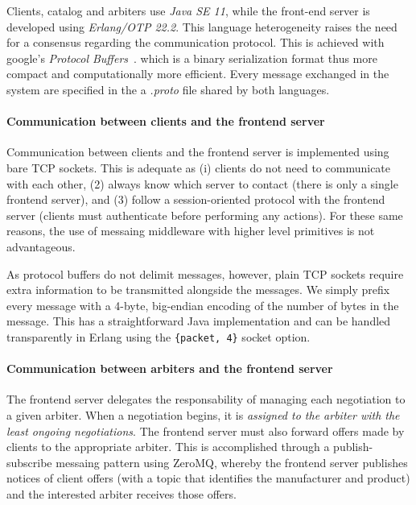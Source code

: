 Clients, catalog and arbiters use \emph{Java SE 11}, while the front-end server is developed using \emph{Erlang/OTP 22.2}. This language heterogeneity raises the need for a consensus regarding the communication protocol. This is achieved with google's \emph{Protocol Buffers}~\cite{website:protobuf}. which is a binary serialization format thus more compact and computationally more efficient. Every message exchanged in the system are specified in the a \emph{.proto} file shared by both languages.  
 
\paragraph{Communication between clients and the frontend server}

Communication between clients and the frontend server is implemented using bare TCP sockets.
This is adequate as (i) clients do not need to communicate with each other, (2) always know which server to contact (there is only a single frontend server), and (3) follow a session-oriented protocol with the frontend server (clients must authenticate before performing any actions).
For these same reasons, the use of messaing middleware with higher level primitives is not advantageous.

As protocol buffers do not delimit messages, however, plain TCP sockets require extra information to be transmitted alongside the messages.
We simply prefix every message with a 4-byte, big-endian encoding of the number of bytes in the message.
This has a straightforward Java implementation and can be handled transparently in Erlang using the \texttt{\{packet, 4\}} socket option.

\paragraph{Communication between arbiters and the frontend server}

The frontend server delegates the responsability of managing each negotiation to a given arbiter.
When a negotiation begins, it is \emph{assigned to the arbiter with the least ongoing negotiations}.
The frontend server must also forward offers made by clients to the appropriate arbiter.
This is accomplished through a publish-subscribe messaing pattern using ZeroMQ, whereby the frontend server publishes notices of client offers (with a topic that identifies the manufacturer and product) and the interested arbiter receives those offers.

